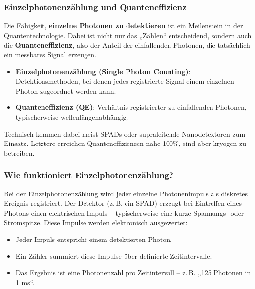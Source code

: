 \subsubsection{Einzelphotonenzählung und Quanteneffizienz}

Die Fähigkeit, \textbf{einzelne Photonen zu detektieren} ist ein Meilenstein in der Quantentechnologie. Dabei ist nicht nur das „Zählen“ entscheidend, sondern auch die \textbf{Quanteneffizienz}, also der Anteil der einfallenden Photonen, die tatsächlich ein messbares Signal erzeugen.
\medskip
\begin{tcolorbox}[physikbox, title=Physikalische Begriffe]
	\label{box:begriffe}
	\small
	\begin{itemize}
		\item \textbf{Einzelphotonenzählung (Single Photon Counting)}: Detektionsmethoden, bei denen jedes registrierte Signal einem einzelnen Photon zugeordnet werden kann.
		\item \textbf{Quanteneffizienz (QE)}: Verhältnis registrierter zu einfallenden Photonen, typischerweise wellenlängenabhängig.
	\end{itemize}
\end{tcolorbox}

Technisch kommen dabei meist SPADs oder supraleitende Nanodetektoren zum Einsatz. Letztere erreichen Quanteneffizienzen nahe 100\%, sind aber kryogen zu betreiben.

\subsubsection*{Wie funktioniert Einzelphotonenzählung?}
Bei der Einzelphotonenzählung wird jeder einzelne Photonenimpuls als diskretes Ereignis registriert. Der Detektor (z.\,B. ein SPAD) erzeugt bei Eintreffen eines Photons einen elektrischen Impuls – typischerweise eine kurze Spannungs- oder Stromspitze. Diese Impulse werden elektronisch ausgewertet:

\begin{itemize}
	\item Jeder Impuls entspricht einem detektierten Photon.
	\item Ein Zähler summiert diese Impulse über definierte Zeitintervalle.
	\item Das Ergebnis ist eine Photonenzahl pro Zeitintervall – z.\,B. „125 Photonen in 1 ms“.
\end{itemize}

